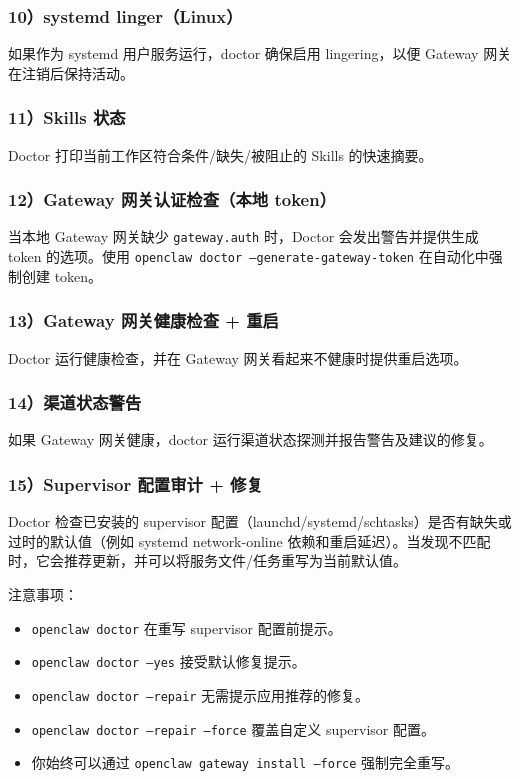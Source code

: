 \subsubsection{10）systemd linger（Linux）}


如果作为 systemd 用户服务运行，doctor 确保启用 lingering，以便 Gateway 网关在注销后保持活动。

\subsubsection{11）Skills 状态}


Doctor 打印当前工作区符合条件/缺失/被阻止的 Skills 的快速摘要。

\subsubsection{12）Gateway 网关认证检查（本地 token）}


当本地 Gateway 网关缺少 \texttt{gateway.auth} 时，Doctor 会发出警告并提供生成 token 的选项。使用 \texttt{openclaw doctor --generate-gateway-token} 在自动化中强制创建 token。

\subsubsection{13）Gateway 网关健康检查 + 重启}


Doctor 运行健康检查，并在 Gateway 网关看起来不健康时提供重启选项。

\subsubsection{14）渠道状态警告}


如果 Gateway 网关健康，doctor 运行渠道状态探测并报告警告及建议的修复。

\subsubsection{15）Supervisor 配置审计 + 修复}


Doctor 检查已安装的 supervisor 配置（launchd/systemd/schtasks）是否有缺失或过时的默认值（例如 systemd network-online 依赖和重启延迟）。当发现不匹配时，它会推荐更新，并可以将服务文件/任务重写为当前默认值。

注意事项：

\begin{itemize}
  \item \texttt{openclaw doctor} 在重写 supervisor 配置前提示。
  \item \texttt{openclaw doctor --yes} 接受默认修复提示。
  \item \texttt{openclaw doctor --repair} 无需提示应用推荐的修复。
  \item \texttt{openclaw doctor --repair --force} 覆盖自定义 supervisor 配置。
  \item 你始终可以通过 \texttt{openclaw gateway install --force} 强制完全重写。
\end{itemize}


